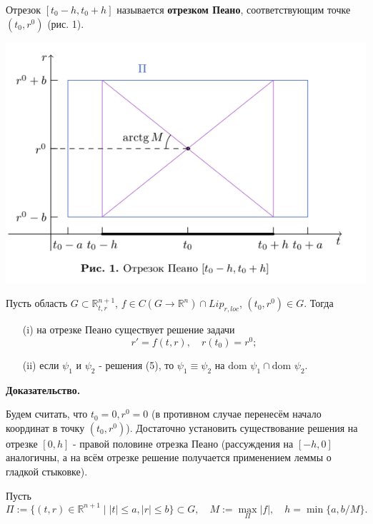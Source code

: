 Отрезок $[t_0 - h, t_0 + h]$
называется \textbf{отрезком Пеано}, соответствующим точке $(t_0, r^0)$ (рис. 1).

\begin{center}
    \includegraphics[width=0.7\linewidth]{assets/7-koshi.png}
\end{center}
    



Пусть область $G \subset \mathbb{R}_{t,r}^{n+1}$, $f \in C(G \to \mathbb{R}^n) \cap Lip_{r, loc}$, $(t_0, r^0) \in G$. Тогда
\begin{enumerate}
    \item[(i)] на отрезке Пеано существует решение задачи        
            $$r' = f(t, r), \quad r(t_0) = r^0;$$        
    \item[(ii)] если $\psi_1$ и $\psi_2$ - решения (5), то $\psi_1 \equiv \psi_2$ на $\text{dom } \psi_1 \cap \text{dom } \psi_2$.
\end{enumerate}

\textbf{Доказательство.}

Будем считать, что $t_0 = 0, r^0 = 0$ (в противном случае перенесём начало координат в точку $(t_0, r^0)$). Достаточно установить существование решения на отрезке $[0, h]$ - правой половине отрезка Пеано (рассуждения на $[-h, 0]$ аналогичны, а на всём отрезке решение получается применением леммы о гладкой стыковке).

Пусть
$$\Pi := \{(t, r) \in \mathbb{R}^{n+1} \mid |t| \leq a, |r| \leq b \} \subset G, \quad M := \max_{\Pi} |f|, \quad h = \min \{a, b/M\}.$$

